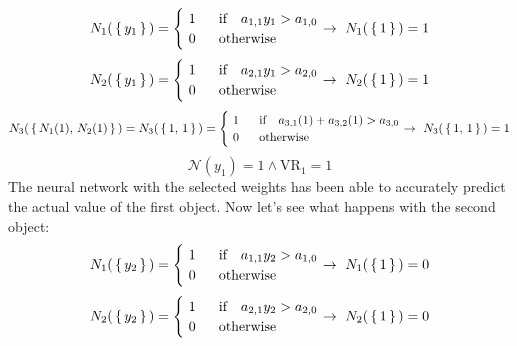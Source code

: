 \documentclass[../main]{subfiles}
\begin{document}
\begin{equation*}
    N_1( \, \{ \, y_1 \, \} \,) = \begin{cases}
  \ 1 \ \ & \text{if } \  \ a_{1,1}y_1>a_{1,0} \\
  \ 0 & \text{otherwise }  
\end{cases}  \rightarrow \ N_1(\, \{ \, 1 \, \}\,) = 1\vspace{3mm}
\end{equation*}
\begin{equation*}
    N_2(\, \{ \, y_1 \, \}\,) = \begin{cases}
  \ 1 \ \ & \text{if } \  \ a_{2,1}y_1>a_{2,0} \\
  \ 0 & \text{otherwise }  
\end{cases}  \rightarrow \ N_2(\, \{ \, 1 \, \}\,) = 1\vspace{3mm}
\end{equation*}
\begin{equation*}
    N_3(\, \{ \, N_1(1), \, N_2(1)\, \} \,) = N_3(\, \{ \, 1, \, 1\, \} \,) = \begin{cases}
  \ 1 \ \ & \text{if } \  \ a_{3,1}(1)+a_{3,2}(1)  >a_{3,0} \\
  \ 0 & \text{otherwise }  
\end{cases}  \rightarrow \ N_3(\, \{ \, 1, \, 1\, \} \,) = 1\vspace{3mm}
\end{equation*}
\begin{equation*}
    \mathcal{N}(y_1) = 1 \land \text{VR}_1 = 1
\end{equation*}
The neural network with the selected weights has been able to accurately predict the actual value of the first object. Now let’s see what happens with the second object:
\begin{equation*}
    N_1( \, \{ \, y_2 \, \} \,) = \begin{cases}
  \ 1 \ \ & \text{if } \  \ a_{1,1}y_2>a_{1,0} \\
  \ 0 & \text{otherwise }  
\end{cases}  \rightarrow \ N_1(\, \{ \, 1 \, \}\,) = 0\vspace{3mm}
\end{equation*}
\begin{equation*}
    N_2(\, \{ \, y_2 \, \}\,) = \begin{cases}
  \ 1 \ \ & \text{if } \  \ a_{2,1}y_2>a_{2,0} \\
  \ 0 & \text{otherwise }  
\end{cases}  \rightarrow \ N_2(\, \{ \, 1 \, \}\,) = 0\vspace{3mm}
\end{equation*}
\end{document}
